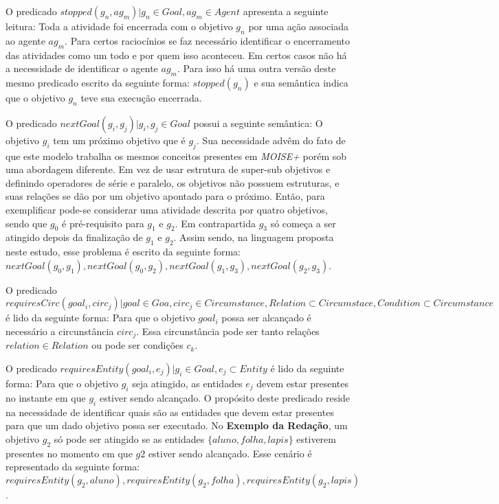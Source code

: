 O predicado $stopped(g_n, ag_m) | g_n \in Goal, ag_m \in Agent$ apresenta a seguinte leitura: Toda a atividade foi encerrada com o objetivo $g_n$ por uma ação associada ao agente $ag_m$. Para certos raciocínios se faz necessário identificar o encerramento das atividades como um todo e por quem isso aconteceu. Em certos casos não há a necessidade de identificar o agente $ag_m$. Para isso há uma outra versão deste mesmo predicado escrito da seguinte forma: $stopped(g_n)$ e sua semântica indica que o objetivo $g_n$ teve sua execução encerrada. 

O predicado $nextGoal(g_i,g_j) |g_i, g_j \in Goal$ possui a seguinte semântica: O objetivo $g_i$ tem um próximo objetivo que é $g_j$. Sua necessidade advêm do fato de que este modelo trabalha os mesmos conceitos presentes em \textit{MOISE+} porém sob uma abordagem diferente. Em vez de usar estrutura de super-sub objetivos e definindo operadores de série e paralelo, os objetivos não possuem estruturas, e suas relações se dão por um objetivo apontado para o próximo. Então, para exemplificar pode-se considerar uma atividade descrita por quatro objetivos, sendo que $g_0$ é pré-requisito para $g_1$ e $g_2$. Em contrapartida $g_3$ só começa a ser atingido depois da finalização de $g_1$ e $g_2$. Assim sendo, na linguagem proposta neste estudo, esse problema é escrito da seguinte forma: $nextGoal(g_0,g_1), nextGoal(g_0,g_2), nextGoal(g_1,g_3), nextGoal(g_2,g_3)$.

O predicado $requiresCirc(goal_i,circ_j) | goal \in Goa, circ_j \in Circumstance, Relation \subset Circumstace, Condition \subset Circumstance$ é lido da seguinte forma: Para que o objetivo $goal_i$ possa ser alcançado é necessário a circunstância $circ_j$. Essa circunstância pode ser tanto relações $relation \in Relation$ ou pode ser condições $c_k$.

O predicado $requiresEntity(goal_i, e_j) | g_i \in Goal, e_j \subset Entity $ é lido da seguinte forma: Para que o objetivo $g_i$ seja atingido, as entidades $e_j$ devem estar presentes no instante em que $g_i$ estiver sendo alcançado. O propósito deste predicado reside na necessidade de identificar quais são as entidades que devem estar presentes para que um dado objetivo possa ser executado. No \textbf{Exemplo da Redação}, um objetivo $g_2$ só pode ser atingido se as entidades $\{ aluno, folha, lapis\}$ estiverem presentes no momento em que $g2$ estiver sendo alcançado. Esse cenário é representado da seguinte forma: $requiresEntity(g_2, aluno), requiresEntity(g_2, folha), requiresEntity(g_2, lapis)$.

